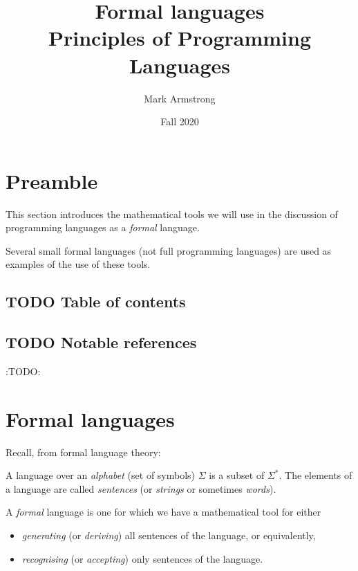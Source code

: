 \documentclass[11pt]{article}
\author{Mark Armstrong}
\date{Fall 2020}
\title{Formal languages\\\medskip
\large Principles of Programming Languages}
\theoremstyle{definition}
\begin{document}
\maketitle

\section{Preamble}
\label{sec:org345506d}

This section introduces the mathematical tools
we will use in the discussion of programming languages
as a \emph{formal} language.

Several small formal languages (not full programming languages)
are used as examples of the use of these tools.

\subsection{{\bfseries\sffamily TODO} Table of contents}
\label{sec:orga56b3ba}

\begin{scriptsize}

\end{scriptsize}

\subsection{{\bfseries\sffamily TODO} Notable references}
\label{sec:org1f13ffc}

:TODO:

\section{Formal languages}
\label{sec:orga5b4f96}

Recall, from formal language theory:

A language over an \emph{alphabet} (set of symbols) \(Σ\)
is a subset of \(Σ^{*}\).
The elements of a language are called \emph{sentences}
(or \emph{strings} or sometimes \emph{words}).

A \emph{formal} language is one for which we have a mathematical tool
for either
\begin{itemize}
\item \emph{generating} (or \emph{deriving}) all sentences of the language,
or equivalently,
\item \emph{recognising} (or \emph{accepting}) only sentences of the language.
\end{itemize}
\end{document}
